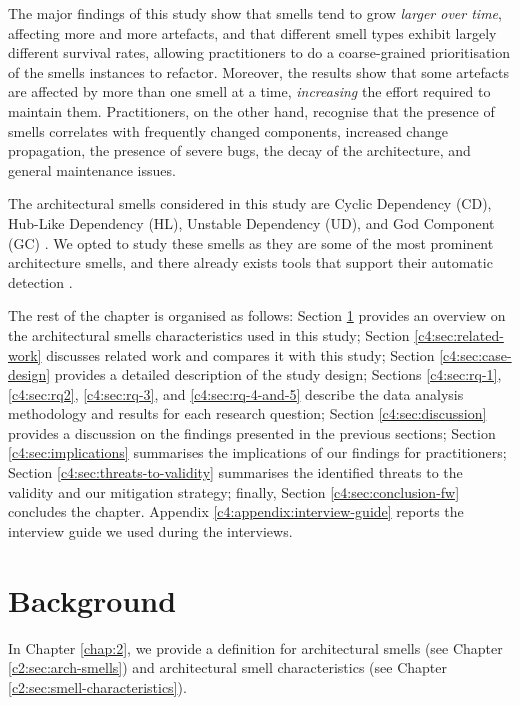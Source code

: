 The major findings of this study show that smells tend to grow \emph{larger over time}, affecting more and more artefacts, and that different smell types exhibit largely different survival rates, allowing practitioners to do a coarse-grained prioritisation of the smells instances to refactor. 
Moreover, the results show that some artefacts are affected by more than one smell at a time, \emph{increasing} the effort required to maintain them.
Practitioners, on the other hand, recognise that the presence of smells correlates with frequently changed components, increased change propagation, the presence of severe bugs, the decay of the architecture, and general maintenance issues.

The architectural smells considered in this study are Cyclic Dependency (CD), Hub-Like Dependency (HL), Unstable Dependency (UD), and God Component (GC) \cite{Arcelli2016,Lippert2006,Sas2019}. We opted to study these smells as they are some of the most prominent architecture smells, and there already exists tools that support their automatic detection \cite{Arcelli2016, Arcelli2017}.

The rest of the chapter is organised as follows: Section \ref{c4:sec:background} provides an overview on the architectural smells  characteristics used in this study; Section \ref{c4:sec:related-work} discusses related work and compares it with this study; Section \ref{c4:sec:case-design} provides a detailed description of the study design; Sections \ref{c4:sec:rq-1}, \ref{c4:sec:rq2}, \ref{c4:sec:rq-3}, and \ref{c4:sec:rq-4-and-5} describe the data analysis methodology and results for each research question; Section \ref{c4:sec:discussion} provides a discussion on the findings presented in the previous sections; Section \ref{c4:sec:implications} summarises the implications of our findings for practitioners; Section \ref{c4:sec:threats-to-validity} summarises the identified threats to the validity and our mitigation strategy; finally, Section \ref{c4:sec:conclusion-fw} concludes the chapter.
Appendix \ref{c4:appendix:interview-guide} reports the interview guide we used during the interviews.

\section{Background}\label{c4:sec:background}
In Chapter \ref{chap:2}, we provide a definition for architectural smells (see Chapter \ref{c2:sec:arch-smells}) and architectural smell characteristics (see Chapter \ref{c2:sec:smell-characteristics}).

